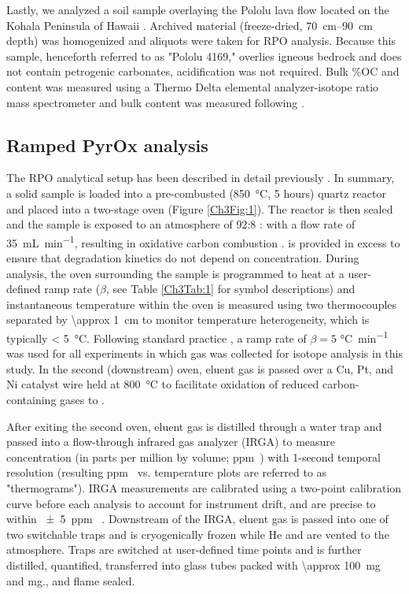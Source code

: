 Lastly, we analyzed a soil sample overlaying the Pololu lava flow located on the Kohala Peninsula of Hawaii \citep[\ang{20.15} N, \ang{155.83} W;][]{Chadwick:2007hc}. Archived material (freeze-dried, \SIrange{70}{90}{cm} depth) was homogenized and aliquots were taken for RPO analysis. Because this sample, henceforth referred to as "Pololu 4169," overlies igneous bedrock and does not contain petrogenic carbonates, acidification was not required. Bulk \%OC and  content was measured using a Thermo Delta elemental analyzer-isotope ratio mass spectrometer and bulk  content was measured following \citet{McNichol:1994ty}.

\subsection{Ramped PyrOx analysis}

The RPO analytical setup has been described in detail previously \citep{Rosenheim:2008ed,Hemingway:2016rc}. In summary, a solid sample is loaded into a pre-combusted (\SI{850}{\celsius}, 5 hours) quartz reactor and placed into a two-stage oven (Figure \ref{Ch3Fig:1}). The reactor is then sealed and the sample is exposed to an atmosphere of $92$:$8$ : with a flow rate of \SI{35}{mL.min^{-1}}, resulting in oxidative carbon combustion \citep[\textit{c.f.} pyrolysis as described in][]{Rosenheim:2008ed}.  is provided in excess to ensure that degradation kinetics do not depend on  concentration. During analysis, the oven surrounding the sample is programmed to heat at a user-defined ramp rate ($\beta$, see Table \ref{Ch3Tab:1} for symbol descriptions) and instantaneous temperature within the oven is measured using two thermocouples separated by \SI{\approx 1}{cm} to monitor temperature heterogeneity, which is typically \SI{< 5}{\celsius}. Following standard practice \citep{Rosenheim:2008ed}, a ramp rate of $\beta = 5$ \si{\celsius.min^{-1}} was used for all experiments in which  gas was collected for isotope analysis in this study. In the second (downstream) oven, eluent gas is passed over a Cu, Pt, and Ni catalyst wire held at \SI{800}{\celsius} to facilitate oxidation of reduced carbon-containing gases to . 

After exiting the second oven, eluent gas is distilled through a water trap and passed into a flow-through infrared gas analyzer (IRGA) to measure  concentration (in parts per million by volume; \si{ppm.}) with 1-second temporal resolution (resulting \si{ppm.} vs. temperature plots are referred to as "thermograms"). IRGA measurements are calibrated using a two-point calibration curve before each analysis to account for instrument drift, and are precise to within \SI{\pm 5}{ppm.} \citep{Hemingway:2016rc}. Downstream of the IRGA, eluent gas is passed into one of two switchable traps and  is cryogenically frozen while He and  are vented to the atmosphere. Traps are switched at user-defined time points and  is further distilled, quantified, transferred into glass tubes packed with \SI{\approx 100}{mg.} and \si{}{mg.}, and flame sealed. 

